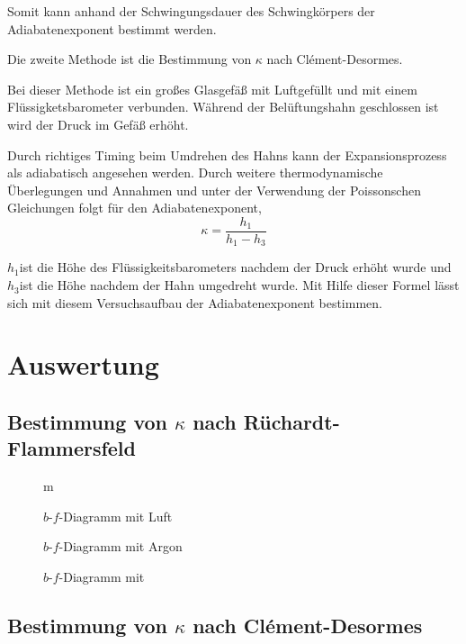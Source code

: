 Somit kann anhand der Schwingungsdauer des Schwingkörpers der Adiabatenexponent
bestimmt werden.

Die zweite Methode ist die Bestimmung von $\kappa$ nach Clément-Desormes.

Bei dieser Methode ist ein großes Glasgefäß mit Luftgefüllt und mit
einem Flüssigketsbarometer verbunden. Während der Belüftungshahn geschlossen
ist wird der Druck im Gefäß erhöht.

Durch richtiges Timing beim Umdrehen des Hahns kann der Expansionsprozess
als adiabatisch angesehen werden. Durch weitere thermodynamische Überlegungen
und Annahmen und unter der Verwendung der Poissonschen Gleichungen
folgt für den Adiabatenexponent,
\begin{equation}
\kappa=\frac{h_{1}}{h_{1}-h_{3}}\label{eq:adiabatenexponent2}
\end{equation}


$h_{1}$ist die Höhe des Flüssigkeitsbarometers nachdem der Druck
erhöht wurde und $h_{3}$ist die Höhe nachdem der Hahn umgedreht wurde.
Mit Hilfe dieser Formel lässt sich mit diesem Versuchsaufbau der Adiabatenexponent
bestimmen.
\newpage

\section{Auswertung}

\subsection{Bestimmung von $ \kappa $ nach Rüchardt-Flammersfeld}


\begin{figure}
\centering
m
\caption{$ b $-$ f $-Diagramm mit Luft}
\end{figure}

\begin{figure}
\centering

\caption{$ b $-$ f $-Diagramm mit Argon}
\end{figure}

\begin{figure}
\centering

\caption{$ b $-$ f $-Diagramm mit }
\end{figure}

\subsection{Bestimmung von $ \kappa $ nach Clément-Desormes}


